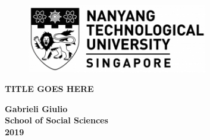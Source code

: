 \begin{center} 
    \vspace*{2cm}
    
 \begin{figure}[ht]
      \centering
      \includegraphics[width=0.7\textwidth]{img/NTUlogoblack.png}
  \end{figure}
  
  \vspace{4cm}
  
  \Large{\textbf{TITLE GOES HERE}}
  
  \vspace{6cm}
  
  \Large{\textbf{Gabrieli Giulio}}\\
  \Large{\textbf{School of Social Sciences}}\\
  \Large{\textbf{2019}}
\end{center}
